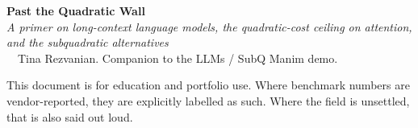 \newpage
\thispagestyle{empty}
\vspace*{\fill}
\begin{center}
  \textbf{\Large Past the Quadratic Wall} \\[0.5em]
  \textit{\large A primer on long-context language models, the quadratic-cost ceiling on attention, and the subquadratic alternatives} \\[2em]

  \textcopyright\ \the\year\ Tina Rezvanian. Companion to the LLMs / SubQ Manim demo.

  \vspace{1.5em}
  \begin{minipage}{0.85\textwidth}
  \small
  This document is for education and portfolio use. Where benchmark numbers are
  vendor-reported, they are explicitly labelled as such. Where the field is
  unsettled, that is also said out loud.
  \end{minipage}
\end{center}
\vspace*{\fill}
\newpage
